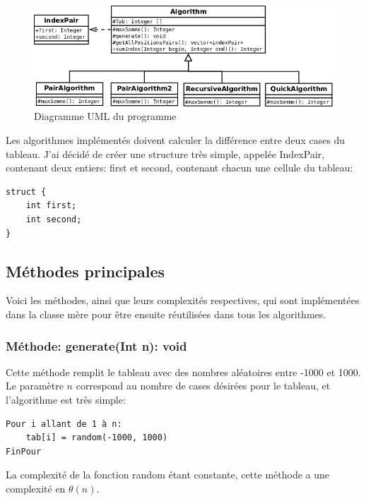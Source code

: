 \documentclass[a4paper, 12pt]{article}
\begin{document}
\begin{figure}[h]
	\centering
	\includegraphics[scale=0.3]{diagramme.png}
	\caption{Diagramme UML du programme}
	\label{uml}	
\end{figure}

 
Les algorithmes implémentés doivent calculer la différence entre deux cases du tableau. J'ai décidé de créer une structure très simple, appelée IndexPair, contenant deux entiers: first et second, contenant chacun une cellule du tableau:
\begin{verbatim}
struct {
    int first;
    int second;
}
\end{verbatim}

\subsection{Méthodes principales}
Voici les méthodes, ainsi que leurs complexités respectives, qui sont implémentées dans la classe mère pour être ensuite réutilisées dans tous les algorithmes.
\subsubsection{Méthode: generate(Int n): void}
Cette méthode remplit le tableau avec des nombres aléatoires entre -1000 et 1000. Le paramètre $n$ correspond au nombre de cases désirées pour le tableau, et l'algorithme est très simple:
\begin{verbatim}
Pour i allant de 1 à n:
    tab[i] = random(-1000, 1000)
FinPour
\end{verbatim}
La complexité de la fonction random étant constante, cette méthode a une complexité en $\theta (n)$.
\end{document}
